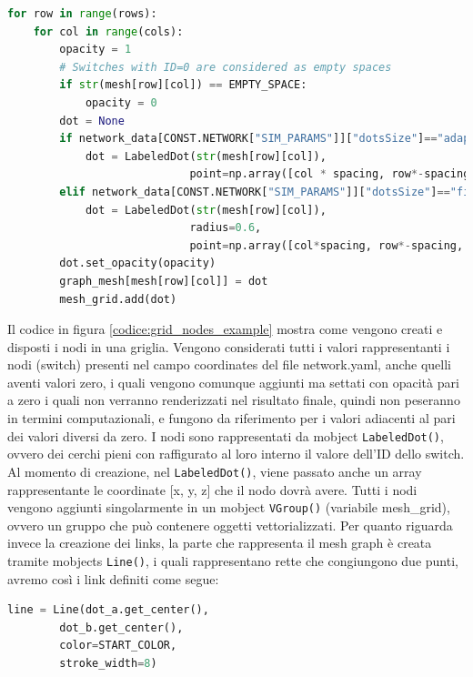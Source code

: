 \documentclass[binding=0.6cm]{sapthesis}
\begin{document}
{\scriptsize %
\begin{lstlisting}[language=Python, caption={creazione posizionamento nodi griglia}, label={codice:grid_nodes_example}]
for row in range(rows):
    for col in range(cols):
        opacity = 1
        # Switches with ID=0 are considered as empty spaces
        if str(mesh[row][col]) == EMPTY_SPACE:
            opacity = 0
        dot = None
        if network_data[CONST.NETWORK["SIM_PARAMS"]]["dotsSize"]=="adaptive":
            dot = LabeledDot(str(mesh[row][col]), 
                            point=np.array([col * spacing, row*-spacing, 0]))
        elif network_data[CONST.NETWORK["SIM_PARAMS"]]["dotsSize"]=="fixed":
            dot = LabeledDot(str(mesh[row][col]), 
                            radius=0.6, 
                            point=np.array([col*spacing, row*-spacing, 0]))
        dot.set_opacity(opacity)
        graph_mesh[mesh[row][col]] = dot
        mesh_grid.add(dot)
\end{lstlisting}
}

Il codice in figura \ref{codice:grid_nodes_example} mostra come vengono creati e disposti i nodi in una griglia. Vengono considerati tutti i valori rappresentanti i nodi (switch)
presenti nel campo coordinates del file network.yaml, anche quelli aventi valori zero, i quali vengono comunque aggiunti ma settati con opacità pari a zero i quali non verranno renderizzati nel risultato finale,
quindi non peseranno in termini computazionali, e fungono da riferimento per i valori adiacenti al pari dei valori diversi da zero.
I nodi sono rappresentati da mobject \lstinline|LabeledDot()|, ovvero dei cerchi pieni con raffigurato al loro interno il valore dell'ID dello switch. Al momento di creazione, nel \lstinline|LabeledDot()|,
viene passato anche un array rappresentante le coordinate [x, y, z] che il nodo dovrà avere. 
Tutti i nodi vengono aggiunti singolarmente in un mobject \lstinline|VGroup()| (variabile mesh\_grid),
ovvero un gruppo che può contenere oggetti vettorializzati.
Per quanto riguarda invece la creazione dei links, la parte che rappresenta il mesh graph è creata tramite mobjects \lstinline|Line()|, i quali
rappresentano rette che congiungono due punti, avremo così i link definiti come segue:

{\scriptsize %
\begin{lstlisting}[language=Python, caption={creazione link}, label={codice:link_creation_example}]
    line = Line(dot_a.get_center(), 
        dot_b.get_center(), 
        color=START_COLOR, 
        stroke_width=8)
\end{lstlisting}
}
\end{document}
